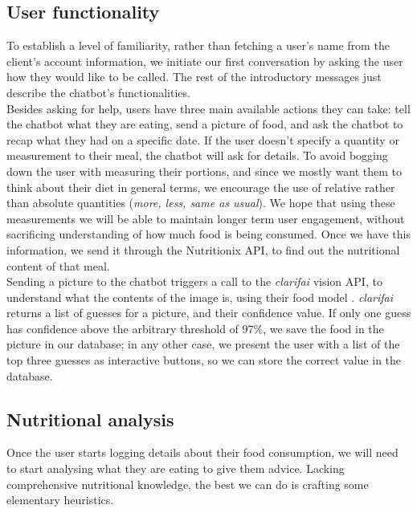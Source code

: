 \subsection{User functionality}
To establish a level of familiarity, rather than fetching a user's name from the client's account information, we initiate our first conversation by asking the user how they would like to be called. The rest of the introductory messages just describe the chatbot's functionalities.\\
Besides asking for help, users have three main available actions they can take: tell the chatbot what they are eating, send a picture of food, and ask the chatbot to recap what they had on a specific date. If the user doesn't specify a quantity or measurement to their meal, the chatbot will ask for details. To avoid bogging down the user with measuring their portions, and since we mostly want them to think about their diet in general terms, we encourage the use of relative rather than absolute quantities (\textit{more, less, same as usual}). We hope that using these measurements we will be able to maintain longer term user engagement, without sacrificing understanding of how much food is being consumed. Once we have this information, we send it through the Nutritionix API, to find out the nutritional content of that meal. \\
Sending a picture to the chatbot triggers a call to the \textit{clarifai} vision API, to understand what the contents of the image is, using their food model \cite{clarifaifood}. \textit{clarifai} returns a list of guesses for a picture, and their confidence value. If only one guess has confidence above the arbitrary threshold of 97\%, we save the food in the picture in our database; in any other case, we present the user with a list of the top three guesses as interactive buttons, so we can store the correct value in the database. 
\subsection{Nutritional analysis}
Once the user starts logging details about their food consumption, we will need to start analysing what they are eating to give them advice. Lacking comprehensive nutritional knowledge, the best we can do is crafting some elementary heuristics. 


